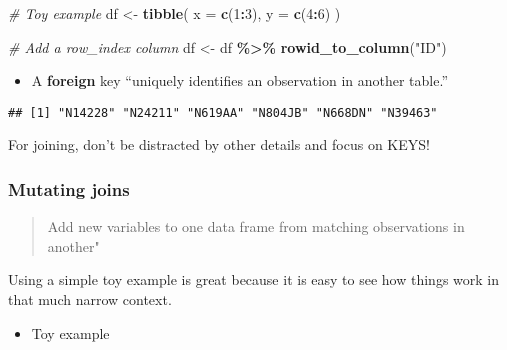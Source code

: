 \documentclass[
]{book}
\newenvironment{Shaded}{\begin{snugshade}}{\end{snugshade}}
\newcommand{\CommentTok}[1]{\textcolor[rgb]{0.56,0.35,0.01}{\textit{#1}}}
\newcommand{\DataTypeTok}[1]{\textcolor[rgb]{0.13,0.29,0.53}{#1}}
\newcommand{\DecValTok}[1]{\textcolor[rgb]{0.00,0.00,0.81}{#1}}
\newcommand{\KeywordTok}[1]{\textcolor[rgb]{0.13,0.29,0.53}{\textbf{#1}}}
\newcommand{\NormalTok}[1]{#1}
\newcommand{\OperatorTok}[1]{\textcolor[rgb]{0.81,0.36,0.00}{\textbf{#1}}}
\newcommand{\StringTok}[1]{\textcolor[rgb]{0.31,0.60,0.02}{#1}}
\providecommand{\tightlist}{%
  \setlength{\itemsep}{0pt}\setlength{\parskip}{0pt}}
\begin{document}
\begin{Shaded}
\begin{Highlighting}[]
\CommentTok{\# Toy example}
\NormalTok{df \textless{}{-}}\StringTok{ }\KeywordTok{tibble}\NormalTok{(}
  \DataTypeTok{x =} \KeywordTok{c}\NormalTok{(}\DecValTok{1}\OperatorTok{:}\DecValTok{3}\NormalTok{),}
  \DataTypeTok{y =} \KeywordTok{c}\NormalTok{(}\DecValTok{4}\OperatorTok{:}\DecValTok{6}\NormalTok{)}
\NormalTok{)}

\CommentTok{\# Add a row\_index column}
\NormalTok{df \textless{}{-}}\StringTok{ }\NormalTok{df }\OperatorTok{\%\textgreater{}\%}\StringTok{ }\KeywordTok{rowid\_to\_column}\NormalTok{(}\StringTok{"ID"}\NormalTok{)}
\end{Highlighting}
\end{Shaded}

\begin{itemize}
\tightlist
\item
  A \textbf{foreign} key ``uniquely identifies an observation in another table.''
\end{itemize}

\begin{Shaded}
\end{Shaded}

\begin{verbatim}
## [1] "N14228" "N24211" "N619AA" "N804JB" "N668DN" "N39463"
\end{verbatim}

For joining, don't be distracted by other details and focus on KEYS!

\hypertarget{mutating-joins}{%
\subsubsection{Mutating joins}\label{mutating-joins}}

\begin{quote}
Add new variables to one data frame from matching observations in another"
\end{quote}

Using a simple toy example is great because it is easy to see how things work in that much narrow context.

\begin{itemize}
\tightlist
\item
  Toy example
\end{itemize}
\end{document}
